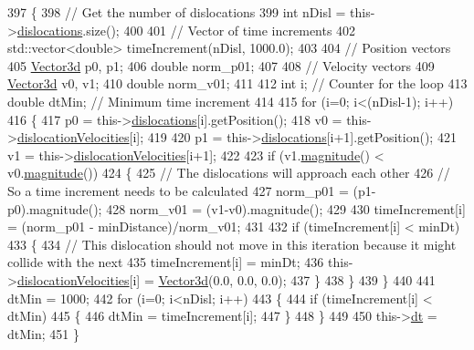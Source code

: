 \begin{DoxyCode}
397  \{
398    \textcolor{comment}{// Get the number of dislocations}
399    \textcolor{keywordtype}{int} nDisl = this->\hyperlink{classSlipPlane_ad92c7c409f7e161db449528389180910}{dislocations}.size();
400 
401    \textcolor{comment}{// Vector of time increments}
402    std::vector<double> timeIncrement(nDisl, 1000.0);
403 
404    \textcolor{comment}{// Position vectors}
405    \hyperlink{classVector3d}{Vector3d} p0, p1;
406    \textcolor{keywordtype}{double} norm\_p01;
407 
408    \textcolor{comment}{// Velocity vectors}
409    \hyperlink{classVector3d}{Vector3d} v0, v1;
410    \textcolor{keywordtype}{double} norm\_v01;
411 
412    \textcolor{keywordtype}{int} i;         \textcolor{comment}{// Counter for the loop}
413    \textcolor{keywordtype}{double} dtMin;  \textcolor{comment}{// Minimum time increment}
414 
415    \textcolor{keywordflow}{for} (i=0; i<(nDisl-1); i++)
416      \{
417        p0 = this->\hyperlink{classSlipPlane_ad92c7c409f7e161db449528389180910}{dislocations}[i].getPosition();
418        v0 = this->\hyperlink{classSlipPlane_a107a3883169bf918664cb4e4fd4bd72c}{dislocationVelocities}[i];
419 
420        p1 = this->\hyperlink{classSlipPlane_ad92c7c409f7e161db449528389180910}{dislocations}[i+1].getPosition();
421        v1 = this->\hyperlink{classSlipPlane_a107a3883169bf918664cb4e4fd4bd72c}{dislocationVelocities}[i+1];
422 
423        \textcolor{keywordflow}{if} (v1.\hyperlink{classVector3d_a9fd3cba8bbdf983db6c2a2eae00c4b29}{magnitude}() < v0.\hyperlink{classVector3d_a9fd3cba8bbdf983db6c2a2eae00c4b29}{magnitude}())
424          \{
425            \textcolor{comment}{// The dislocations will approach each other}
426            \textcolor{comment}{// So a time increment needs to be calculated}
427            norm\_p01 = (p1-p0).magnitude();
428            norm\_v01 = (v1-v0).magnitude();
429 
430            timeIncrement[i] = (norm\_p01 - minDistance)/norm\_v01;
431 
432            \textcolor{keywordflow}{if} (timeIncrement[i] < minDt)
433              \{
434                \textcolor{comment}{// This dislocation should not move in this iteration because it might collide with the next}
435                timeIncrement[i] = minDt;
436                this->\hyperlink{classSlipPlane_a107a3883169bf918664cb4e4fd4bd72c}{dislocationVelocities}[i] = \hyperlink{classVector3d}{Vector3d}(0.0, 0.0, 0.0);
437              \}
438          \}
439      \}
440 
441    dtMin = 1000;
442    \textcolor{keywordflow}{for} (i=0; i<nDisl; i++)
443      \{
444        \textcolor{keywordflow}{if} (timeIncrement[i] < dtMin)
445          \{
446            dtMin = timeIncrement[i];
447          \}
448      \}
449 
450    this->\hyperlink{classSlipPlane_ad786135547799363ad2931e43522c2be}{dt} = dtMin;
451  \}
\end{DoxyCode}
